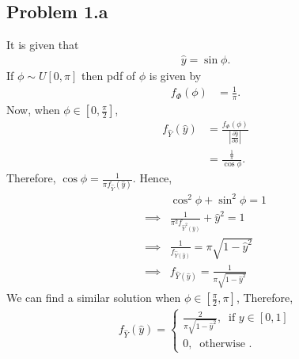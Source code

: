 \subsection*{Problem 1.a}
It is given that
\begin{align*}
	\hat{y} = \sin\phi.
\end{align*}
If $\phi \sim U[0,\pi]$ then pdf of $\phi$ is given by
\begin{align*}
	f_{\Phi}(\phi) &= \frac{1}{\pi}.
\end{align*}
Now, when $\phi \in [0,\frac{\pi}{2}]$,
\begin{align*}
	f_{\hat{Y}}(\hat{y}) &= \frac{f_{\Phi}(\phi)}{|\frac{\partial \hat{y}}{\partial \phi}|}\\
	&= \frac{\frac{1}{\pi}}{\cos \phi}.
\end{align*}
Therefore, $\cos \phi = \frac{1}{\pi f_{\hat{Y}}(\hat{y})}$. Hence,
\begin{align*}
	&\cos^2 \phi + \sin^2 \phi = 1\\
	\implies & \frac{1}{\pi^2 f_{\hat{Y}^2(\hat{y})}} + \hat{y}^2 = 1\\
	\implies & \frac{1}{f_{\hat{Y}(\hat{y})}} = \pi\sqrt{1-\hat{y}^2}\\
	\implies & f_{\hat{Y}(\hat{y})} = \frac{1}{\pi\sqrt{1-\hat{y}^2}}
\end{align*}
We can find a similar solution when  $\phi \in [\frac{\pi}{2}, \pi]$,
Therefore,
\begin{align*}
	f_{\hat{Y}}(\hat{y}) = \begin{cases}
		\frac{2}{\pi\sqrt{1-\hat{y}^2}},\ \text{ if }y\in[0,1]\\
		0,\ \text{ otherwise }.
	\end{cases}
\end{align*}
